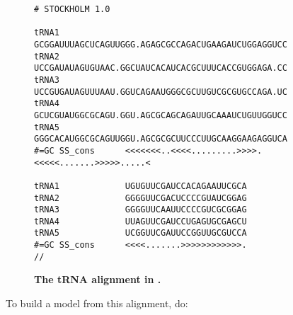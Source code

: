 \begin{figure}[ht]
\begin{center}\begin{minipage}{5.5in}
\footnotesize{
\begin{verbatim}
# STOCKHOLM 1.0

tRNA1             GCGGAUUUAGCUCAGUUGGG.AGAGCGCCAGACUGAAGAUCUGGAGGUCC
tRNA2             UCCGAUAUAGUGUAAC.GGCUAUCACAUCACGCUUUCACCGUGGAGA.CC
tRNA3             UCCGUGAUAGUUUAAU.GGUCAGAAUGGGCGCUUGUCGCGUGCCAGA.UC
tRNA4             GCUCGUAUGGCGCAGU.GGU.AGCGCAGCAGAUUGCAAAUCUGUUGGUCC
tRNA5             GGGCACAUGGCGCAGUUGGU.AGCGCGCUUCCCUUGCAAGGAAGAGGUCA
#=GC SS_cons      <<<<<<<..<<<<.........>>>>.<<<<<.......>>>>>.....<

tRNA1             UGUGUUCGAUCCACAGAAUUCGCA
tRNA2             GGGGUUCGACUCCCCGUAUCGGAG
tRNA3             GGGGUUCAAUUCCCCGUCGCGGAG
tRNA4             UUAGUUCGAUCCUGAGUGCGAGCU
tRNA5             UCGGUUCGAUUCCGGUUGCGUCCA
#=GC SS_cons      <<<<.......>>>>>>>>>>>>.
//
\end{verbatim}
}
\end{minipage}\end{center}
\caption{\textbf{The tRNA alignment in .}}
\label{fig:tutorial.sto}
\end{figure}

To build a model from this alignment, do:

\begin{center}
\end{center}


       

       


 
 

